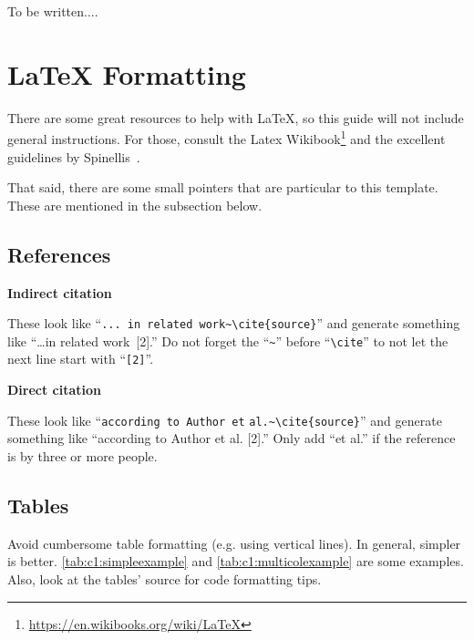{\color{red} To be written...}.


\section{\LaTeX{} Formatting}
\label{sec:c1:latex}

There are some great resources to help with \LaTeX,
so this guide will not include general instructions.
For those, consult the Latex Wikibook\footnote{\url{https://en.wikibooks.org/wiki/LaTeX}}
and the excellent guidelines by Spinellis~\cite{spinellis:latexadvice}.

That said, there are some small pointers that are particular to this template.
These are mentioned in the subsection below.

\subsection{References}
\label{sec:c1:References}

\noindent
\textbf{Indirect citation}

These look like ``\verb|... in related work~\cite{source}|'' and generate something like ``\dots in related work~[2].''
Do not forget the ``\verb|~|'' before ``\verb|\cite|'' to not let the next line start with ``\verb|[2]|''.

\vspace{0.5cm}
\noindent
\textbf{Direct citation}

These look like ``\texttt{according to Author et} \verb|al.~\cite{source}|'' and generate something like ``according to Author et al. [2].''
Only add ``et al.'' if the reference is by three or more people.

\subsection{Tables}
\label{sec:c1:latex_tables}

Avoid cumbersome table formatting (e.g. using vertical lines).
In general, simpler is better.
\autoref{tab:c1:simpleexample} and \autoref{tab:c1:multicolexample} are some examples.
Also, look at the tables' source for code formatting tips.

